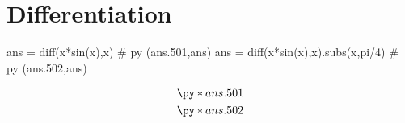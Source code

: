 \section*{Differentiation}

\vspace{-10pt}

\begin{python}
   ans = diff(x*sin(x),x)                                    # py (ans.501,ans)
   ans = diff(x*sin(x),x).subs(x,pi/4)                       # py (ans.502,ans)
\end{python}

\begin{align*}
   &\py*{ans.501}\\
   &\py*{ans.502}
\end{align*}
